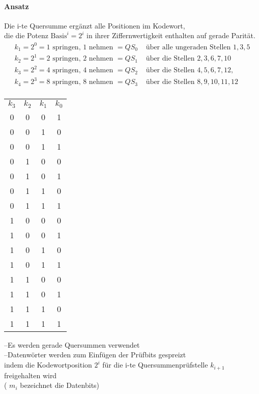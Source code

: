 \documentclass[a4paper]{scrartcl}
\begin{document}
					\paragraph{Ansatz}
						Die i-te Quersumme ergänzt alle Positionen im Kodewort,\\
						die die Potenz \(\text{Basis}^i = 2^i  \) in ihrer Ziffernwertigkeit enthalten auf gerade Parität.\\
						\begin{align*}
							k_1 = 2^0 = 1 \text{ springen, 1 nehmen } =  QS_0 &\text{ über alle ungeraden Stellen } 1,3,5 \\
							k_2 = 2^1 = 2 \text{ springen, 2 nehmen } =  QS_1 &\text{ über die Stellen } 2,3,6,7, 10 \\
							k_3 = 2^2 = 4 \text{ springen, 4 nehmen } = QS_2 &\text{ über die Stellen } 4, 5, 6, 7, 12,  \\
							k_4 = 2^3 =  8 \text{ springen, 8 nehmen } = QS_3 &\text{ über die Stellen } 8, 9, 10, 11, 12 \\
						\end{align*}
						
						\begin{table}[h]
							\centering
							\begin{tabular}{c c c c}
								\(k_3\) &\(k_2\) & \(k_1\)& \( k_0 \)\\
								0&0&0&1\\
								0&0&1&0\\
								0&0&1&1\\
								0&1&0&0\\
								0&1&0&1\\
								0&1&1&0\\
								0&1&1&1\\
								1&0&0&0\\
								1&0&0&1\\
								1&0&1&0\\
								1&0&1&1\\
								1&1&0&0\\
								1&1&0&1\\
								1&1&1&0\\
								1&1&1&1\\
							\end{tabular}
						\end{table}
					
					--Es werden gerade Quersummen verwendet\\
					--Datenwörter werden zum Einfügen der Prüfbits gespreizt\\
					indem die Kodewortposition \( 2^i \) für die i-te Quersummenprüfstelle \( k_{i+1} \) freigehalten wird \\
					( \( m_i  \) bezeichnet die Datenbits)\\
					
\end{document}
